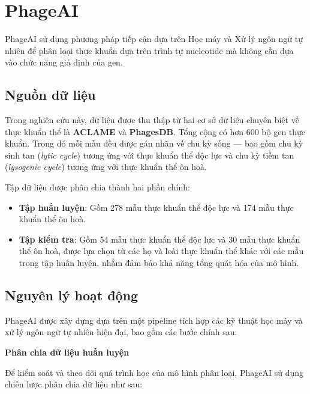 \section{PhageAI}

PhageAI\cite{tynecki2020phageai} sử dụng phương pháp tiếp cận dựa trên Học máy và Xử lý ngôn ngữ tự nhiên để phân loại thực khuẩn dựa trên trình tự nucleotide mà không cần dựa vào chức năng giả định của gen.

\subsection{Nguồn dữ liệu}

Trong nghiên cứu này, dữ liệu được thu thập từ hai cơ sở dữ liệu chuyên biệt về thực khuẩn thể là \textbf{ACLAME} và \textbf{PhagesDB}. Tổng cộng có hơn 600 bộ gen thực khuẩn. Trong đó mỗi mẫu đều được gán nhãn về chu kỳ sống — bao gồm chu kỳ sinh tan (\textit{lytic cycle}) tương ứng với thực khuẩn thể độc lực và chu kỳ tiềm tan (\textit{lysogenic cycle}) tương ứng với thực khuẩn thể ôn hoà.

Tập dữ liệu được phân chia thành hai phần chính:

\begin{itemize}
\item \textbf{Tập huấn luyện}: Gồm 278 mẫu thực khuẩn thể độc lực và 174 mẫu thực khuẩn thể ôn hoà.
\item \textbf{Tập kiểm tra}: Gồm 54 mẫu thực khuẩn thể độc lực và 30 mẫu thực khuẩn thể ôn hoà, được lựa chọn từ các họ và loài thực khuẩn thể khác với các mẫu trong tập huấn luyện, nhằm đảm bảo khả năng tổng quát hóa của mô hình.
\end{itemize}

\subsection{Nguyên lý hoạt động}

PhageAI được xây dựng dựa trên một pipeline tích hợp các kỹ thuật học máy và xử lý ngôn ngữ tự nhiên hiện đại, bao gồm các bước chính sau:

\textbf{Phân chia dữ liệu huấn luyện}

Để kiểm soát và theo dõi quá trình học của mô hình phân loại, PhageAI sử dụng chiến lược phân chia dữ liệu như sau:

